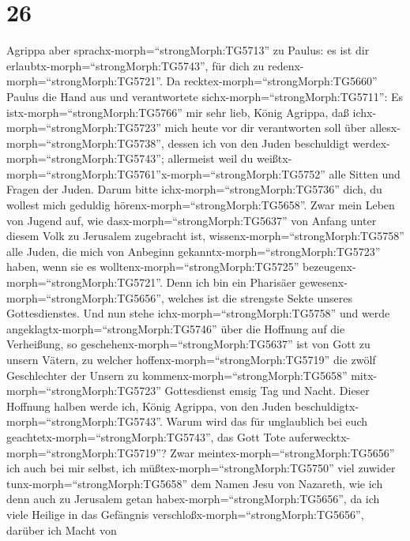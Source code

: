 \hypertarget{section-25}{%
\section{26}\label{section-25}}

 Agrippa aber sprachx-morph=``strongMorph:TG5713'' zu
Paulus: es ist dir erlaubtx-morph=``strongMorph:TG5743'', für dich zu
redenx-morph=``strongMorph:TG5721''. Da
recktex-morph=``strongMorph:TG5660'' Paulus die Hand aus und
verantwortete sichx-morph=``strongMorph:TG5711'':  Es
istx-morph=``strongMorph:TG5766'' mir sehr lieb, König Agrippa, daß
ichx-morph=``strongMorph:TG5723'' mich heute vor dir verantworten soll
über allesx-morph=``strongMorph:TG5738'', dessen ich von den Juden
beschuldigt werdex-morph=``strongMorph:TG5743'';  allermeist
weil du
weißtx-morph=``strongMorph:TG5761''x-morph=``strongMorph:TG5752'' alle
Sitten und Fragen der Juden. Darum bitte
ichx-morph=``strongMorph:TG5736'' dich, du wollest mich geduldig
hörenx-morph=``strongMorph:TG5658''.  Zwar mein Leben von
Jugend auf, wie dasx-morph=``strongMorph:TG5637'' von Anfang unter
diesem Volk zu Jerusalem zugebracht ist,
wissenx-morph=``strongMorph:TG5758'' alle Juden,  die mich
von Anbeginn gekanntx-morph=``strongMorph:TG5723'' haben, wenn sie es
wolltenx-morph=``strongMorph:TG5725''
bezeugenx-morph=``strongMorph:TG5721''. Denn ich bin ein Pharisäer
gewesenx-morph=``strongMorph:TG5656'', welches ist die strengste Sekte
unseres Gottesdienstes.  Und nun stehe
ichx-morph=``strongMorph:TG5758'' und werde
angeklagtx-morph=``strongMorph:TG5746'' über die Hoffnung auf die
Verheißung, so geschehenx-morph=``strongMorph:TG5637'' ist von Gott zu
unsern Vätern,  zu welcher
hoffenx-morph=``strongMorph:TG5719'' die zwölf Geschlechter der Unsern
zu kommenx-morph=``strongMorph:TG5658''
mitx-morph=``strongMorph:TG5723'' Gottesdienst emsig Tag und Nacht.
Dieser Hoffnung halben werde ich, König Agrippa, von den Juden
beschuldigtx-morph=``strongMorph:TG5743''.  Warum wird das
für unglaublich bei euch geachtetx-morph=``strongMorph:TG5743'', das
Gott Tote auferwecktx-morph=``strongMorph:TG5719''?  Zwar
meintex-morph=``strongMorph:TG5656'' ich auch bei mir selbst, ich
müßtex-morph=``strongMorph:TG5750'' viel zuwider
tunx-morph=``strongMorph:TG5658'' dem Namen Jesu von Nazareth,
 wie ich denn auch zu Jerusalem getan
habex-morph=``strongMorph:TG5656'', da ich viele Heilige in das
Gefängnis verschloßx-morph=``strongMorph:TG5656'', darüber ich Macht von
